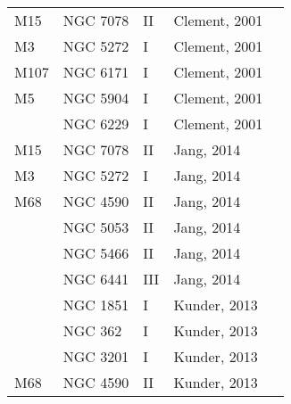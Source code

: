\documentclass[]{article}
\begin{document}
\begin{longtable}{
	p{1.5cm}|
	p{2.5cm}|
	p{2.5cm}|
	p{3.7cm}|
	p{5.5cm}
	@{}}
		M15            & NGC 7078     & II         & Clement, 2001        &                                                                        \\
		M3             & NGC 5272     & I          & Clement, 2001        &                                                                        \\
		M107           & NGC 6171     & I          & Clement, 2001        &                                                                        \\
		M5             & NGC 5904     & I          & Clement, 2001        &                                                                        \\
		& NGC 6229     & I          & Clement, 2001        &                                                                        \\
		M15            & NGC 7078     & II         & Jang, 2014 \cite{jang_2014}           &                                                                        \\
		M3             & NGC 5272     & I          & Jang, 2014           &                                                                        \\
		M68            & NGC 4590     & II         & Jang, 2014           &                                                                        \\
		& NGC 5053     & II         & Jang, 2014           &                                                                        \\
		& NGC 5466     & II         & Jang, 2014           &                                                                        \\
		& NGC 6441     & III        & Jang, 2014           &                                                                        \\
		& NGC 1851     & I          & Kunder, 2013 \cite{kunder_2013_d}         &                                                                        \\
		& NGC 362      & I          & Kunder, 2013         &                                                                        \\
		& NGC 3201     & I          & Kunder, 2013         &                                                                        \\
		M68            & NGC 4590     & II         & Kunder, 2013         &                                                                        \\

\end{longtable}
\end{document}
